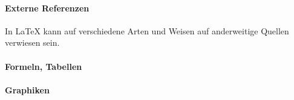 \paragraph*{Externe Referenzen}%
%
% 
%
In \LaTeX{} kann auf verschiedene Arten und Weisen auf anderweitige Quellen verwiesen sein. 


%
%
% 
%
\paragraph*{Formeln, Tabellen}



\paragraph*{Graphiken}%







